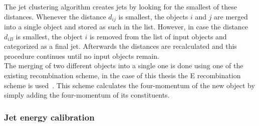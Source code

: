 The jet clustering algorithm creates jets by looking for the smallest of these distances. Whenever the distance $d_{ij}$ is smallest, the objects $i$ and $j$ are merged into a single object and stored as such in the list. However, in case the distance $d_{iB}$ is smallest, the object $i$ is removed from the list of input objects and categorized as a final jet. Afterwards the distances are recalculated and this procedure continues until no input objects remain.
\\
The merging of two different objects into a single one is done using one of the existing recombination scheme, in the case of this thesis the E recombination scheme is used~\cite{}. This scheme calculates the four-momentum of the new object by simply adding the four-momentum of its constituents. %

\subsubsection*{Jet energy calibration}


